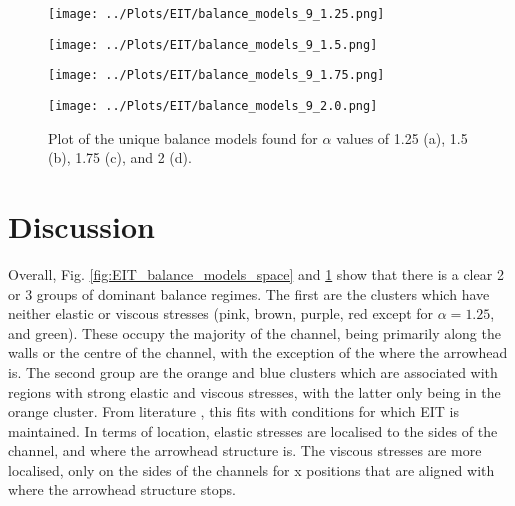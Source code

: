 \documentclass[12pt]{report} %
\begin{document}
\begin{figure}[htbp]
  \centering
  \begin{minipage}{0.5\textwidth}
    \centering
    \texttt{[image: ../Plots/EIT/balance\_models\_9\_1.25.png]}
    \subcaption{}
  \end{minipage}

  \begin{minipage}{0.5\textwidth}
    \centering
    \texttt{[image: ../Plots/EIT/balance\_models\_9\_1.5.png]}
    \subcaption{}
  \end{minipage}

  \begin{minipage}{0.45\textwidth}
    \centering
    \texttt{[image: ../Plots/EIT/balance\_models\_9\_1.75.png]}
    \subcaption{}
  \end{minipage}

  \begin{minipage}{0.45\textwidth}
    \centering
    \texttt{[image: ../Plots/EIT/balance\_models\_9\_2.0.png]}
    \subcaption{}
  \end{minipage}

  \caption{Plot of the unique balance models found for $\alpha$ values of 1.25 (a), 1.5 (b), 1.75 (c), and 2 (d).}
  \label{fig:EIT_balance_models}
\end{figure}


\section{Discussion}

Overall, Fig. \ref{fig:EIT_balance_models_space} and \ref{fig:EIT_balance_models} show that there is a clear 2 or 3 groups of dominant balance regimes. The first are the clusters which have neither elastic or viscous stresses (pink, brown, purple, red except for $\alpha = 1.25$, and green). These occupy the majority of the channel, being primarily along the walls or the centre of the channel, with the exception of the where the arrowhead is. The second group are the orange and blue clusters which are associated with regions with strong elastic and viscous stresses, with the latter only being in the orange cluster. From literature \cite{beneitez2024multistability,Samanta2012eit,dubief2022first}, this fits with conditions for which EIT is maintained. In terms of location, elastic stresses are localised to the sides of the channel, and where the arrowhead structure is. The viscous stresses are more localised, only on the sides of the channels for x positions that are aligned with where the arrowhead structure stops.
\end{document}
